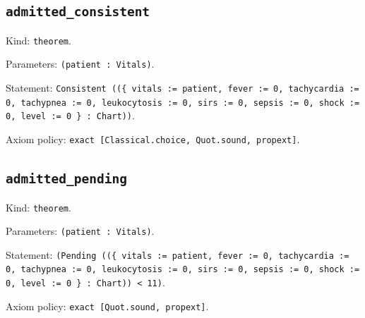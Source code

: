 \documentclass[11pt]{article}
\begin{document}
\subsection*{\texttt{admitted\_consistent}}
\noindent Kind: \texttt{theorem}.\par
\noindent Parameters: \texttt{(patient : Vitals)}.\par
\noindent Statement: \texttt{Consistent ((\{ vitals := patient, fever := 0, tachycardia := 0, tachypnea := 0, leukocytosis := 0, sirs := 0, sepsis := 0, shock := 0, level := 0 \} : Chart))}.\par
\noindent Axiom policy: \texttt{exact [Classical.choice, Quot.sound, propext]}.\par
\subsection*{\texttt{admitted\_pending}}
\noindent Kind: \texttt{theorem}.\par
\noindent Parameters: \texttt{(patient : Vitals)}.\par
\noindent Statement: \texttt{(Pending ((\{ vitals := patient, fever := 0, tachycardia := 0, tachypnea := 0, leukocytosis := 0, sirs := 0, sepsis := 0, shock := 0, level := 0 \} : Chart)) < 11)}.\par
\noindent Axiom policy: \texttt{exact [Quot.sound, propext]}.\par
\end{document}
